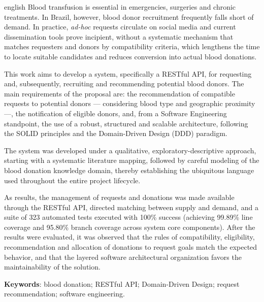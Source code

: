\documentclass[
  12pt,
  oneside,              %
  openany,
  a4paper,
  english,
  brazilian
]{abntex2}
\begin{document}
\begin{resumo}[Abstract]
  \begin{otherlanguage*}{english}
    Blood transfusion is essential in emergencies, surgeries and chronic treatments. In Brazil, however, blood donor recruitment frequently falls short of demand. In practice, \textit{ad-hoc} requests circulate on social media and current dissemination tools prove incipient, without a systematic mechanism that matches requesters and donors by compatibility criteria, which lengthens the time to locate suitable candidates and reduces conversion into actual blood donations.

    This work aims to develop a system, specifically a RESTful API, for requesting and, subsequently, recruiting and recommending potential blood donors. The main requirements of the proposal are: the recommendation of compatible requests to potential donors --- considering blood type and geographic proximity ---, the notification of eligible donors, and, from a Software Engineering standpoint, the use of a robust, structured and scalable architecture, following the SOLID principles and the Domain-Driven Design (DDD) paradigm.

    The system was developed under a qualitative, exploratory-descriptive approach, starting with a systematic literature mapping, followed by careful modeling of the blood donation knowledge domain, thereby establishing the ubiquitous language used throughout the entire project lifecycle.

    As results, the management of requests and donations was made available through the RESTful API, directed matching between supply and demand, and a suite of 323 automated tests executed with 100\% success (achieving 99.89\% line coverage and 95.80\% branch coverage across system core components). After the results were evaluated, it was observed that the rules of compatibility, eligibility, recommendation and allocation of donations to request goals match the expected behavior, and that the layered software architectural organization favors the maintainability of the solution.

    \vspace{\onelineskip}
    \noindent
    \textbf{Keywords}: blood donation; RESTful API; Domain-Driven Design; request recommendation; software engineering.
  \end{otherlanguage*}
\end{resumo}

\tableofcontents*
\clearpage
\end{document}
